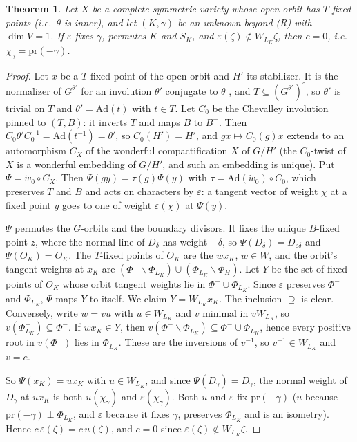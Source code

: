 \documentclass[11pt]{amsart}
\newtheorem{theorem}{Theorem}[section]
\theoremstyle{definition}
\theoremstyle{remark}
\newcommand{\pr}{\mathrm{pr}}
\begin{document}
\begin{theorem}\label{thm:opposition}
Let $X$ be a complete symmetric variety whose open orbit has $T$-fixed
points (i.e.\ $\theta$ is inner), and let $(K,\gamma)$ be an unknown beyond
\textup{(R)} with $\dim V=1$. If $\varepsilon$ fixes $\gamma$, permutes $K$ and
$S_K$, and $\varepsilon(\zeta)\notin W_{L_K}\zeta$, then $c=0$, i.e.\
$\chi_\gamma = \pr(-\gamma)$.
\end{theorem}
\begin{proof}
Let $x$ be a $T$-fixed point of the open orbit and $H'$ its stabilizer. It
is the normalizer of $G^{\theta'}$ for an involution $\theta'$ conjugate to
$\theta$ \cite{DCP83}, and $T\subseteq (G^{\theta'})^\circ$, so $\theta'$ is
trivial on $T$ and $\theta'=\mathrm{Ad}(t)$ with $t\in T$. Let $C_0$ be the
Chevalley involution pinned to $(T,B)$: it inverts $T$ and maps $B$ to
$B^-$. Then $C_0\theta'C_0^{-1}=\mathrm{Ad}(t^{-1})=\theta'$, so $C_0(H')=H'$,
and $gx\mapsto C_0(g)x$ extends to an automorphism $C_X$ of the wonderful
compactification $X$ of $G/H'$ (the $C_0$-twist of $X$ is a wonderful
embedding of $G/H'$, and such an embedding is unique). Put
$\Psi=\dot w_0\circ C_X$. Then $\Psi(gy)=\tau(g)\Psi(y)$ with
$\tau=\mathrm{Ad}(\dot w_0)\circ C_0$, which preserves $T$ and $B$ and acts on
characters by $\varepsilon$: a tangent vector of weight $\chi$ at a fixed
point $y$ goes to one of weight $\varepsilon(\chi)$ at $\Psi(y)$.

$\Psi$ permutes the $G$-orbits and the boundary divisors. It fixes the
unique $B$-fixed point $z$, where the normal line of $D_\delta$ has weight
$-\delta$, so $\Psi(D_\delta)=D_{\varepsilon\delta}$ and $\Psi(O_K)=O_K$.
The $T$-fixed points of $O_K$ are the $wx_K$, $w\in W$, and the orbit's
tangent weights at $x_K$ are $(\Phi^-\smallsetminus\Phi_{L_K})\cup(\Phi_{L_K}
\smallsetminus\Phi_{H})$. Let $Y$ be the set of fixed points of $O_K$ whose
orbit tangent weights lie in $\Phi^-\cup\Phi_{L_K}$. Since $\varepsilon$
preserves $\Phi^-$ and $\Phi_{L_K}$, $\Psi$ maps $Y$ to itself. We claim
$Y=W_{L_K}x_K$. The inclusion $\supseteq$ is clear. Conversely, write $w=vu$
with $u\in W_{L_K}$ and $v$ minimal in $vW_{L_K}$, so $v(\Phi^-_{L_K})\subseteq
\Phi^-$. If $wx_K\in Y$, then $v(\Phi^-\smallsetminus\Phi_{L_K})\subseteq
\Phi^-\cup\Phi_{L_K}$, hence every positive root in $v(\Phi^-)$ lies in
$\Phi_{L_K}$. These are the inversions of $v^{-1}$, so $v^{-1}\in W_{L_K}$ and
$v=e$.

So $\Psi(x_K)=ux_K$ with $u\in W_{L_K}$, and since $\Psi(D_\gamma)=D_\gamma$,
the normal weight of $D_\gamma$ at $ux_K$ is both $u(\chi_\gamma)$ and
$\varepsilon(\chi_\gamma)$. Both $u$ and $\varepsilon$ fix $\pr(-\gamma)$ ($u$
because $\pr(-\gamma)\perp\Phi_{L_K}$, and $\varepsilon$ because it fixes
$\gamma$, preserves $\Phi_{L_K}$ and is an isometry). Hence
$c\,\varepsilon(\zeta)=c\,u(\zeta)$, and $c=0$ since
$\varepsilon(\zeta)\notin W_{L_K}\zeta$.
\end{proof}
\end{document}
